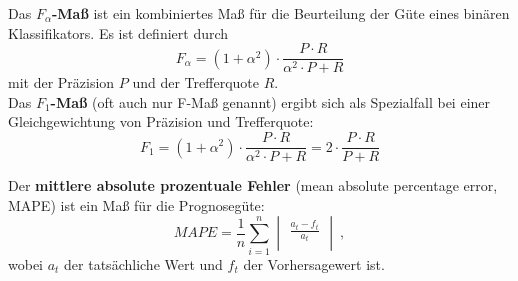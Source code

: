 \documentclass[
	a4paper,
	12pt,
	bibliography=totocnumbered,
	twoside,
]{scrreprt}
\begin{document}
\vspace{1.5cm}
\begin{Definition}[F-Maß]
    Das \textbf{$F_\alpha$-Maß} ist ein kombiniertes Maß für die Beurteilung der Güte eines binären Klassifikators. Es ist definiert durch
    \begin{equation}
        F_{\alpha} = (1 + \alpha^2) \cdot \frac{P \cdot R}{\alpha^2 \cdot P + R}
    \end{equation}
    mit der Präzision $P$ und der Trefferquote $R$.\\
    
    Das \textbf{$F_1$-Maß} (oft auch nur F-Maß genannt) ergibt sich als Spezialfall bei einer Gleichgewichtung von Präzision und Trefferquote:
    \begin{equation}
        F_1 = (1 + \alpha^2) \cdot \frac{P \cdot R}{\alpha^2 \cdot P + R} 
            = 2 \cdot \frac{P \cdot R}{P + R}
    \end{equation}
\end{Definition}



\vspace{1.5cm}
\begin{Definition}
    Der \textbf{mittlere absolute prozentuale Fehler} (mean absolute percentage error, MAPE) ist ein Maß für die Prognosegüte:
    \begin{equation}
        MAPE = \frac{1}{n} \sum_{i = 1}^{n} \begin{vmatrix}\frac{a_t - f_t}{a_t} \\ \end{vmatrix} \ ,
    \end{equation}
    wobei $a_t$ der tatsächliche Wert und $f_t$ der Vorhersagewert ist.
		\label{def:mape}
\end{Definition}



\newpage
\end{document}

